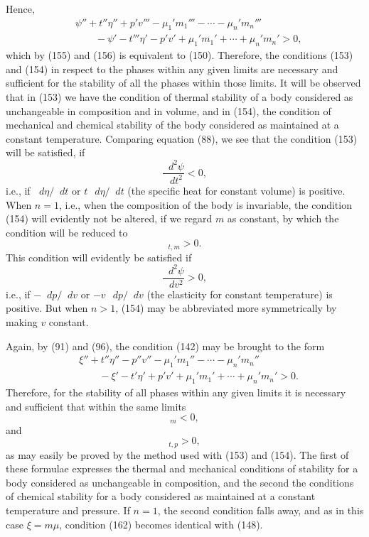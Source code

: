\documentclass[11pt]{article}
\newcommand{\dd}{\mathop{}\!d}
\newcommand{\D}{\Delta}
\begin{document}
Hence,
\begin{equation}
\begin{aligned}
&\psi''+t''\eta''+p'v'''-\mu_1'm_1'''-\cdots-\mu_n'm_n'''\\
&\qquad{}-\psi'-t'''\eta'-p'v'+\mu_1'm_1'+\cdots+\mu_n'm_n'>0,
\end{aligned}
\end{equation}
which by (155) and (156) is equivalent to (150). Therefore, the conditions (153) and (154) in respect to the phases within any given limits are necessary and sufficient for the stability of all the phases within those limits. It will be observed that in (153) we have the condition of thermal stability of a body considered as unchangeable in composition and in volume, and in (154), the condition of mechanical and chemical stability of the body considered as maintained at a constant temperature. Comparing equation (88), we see that the condition (153) will be satisfied, if
\[
\frac{\dd^2\psi}{\dd t^2}<0,
\]
i.e., if $\dd\eta/\dd t$ or $t\,\dd\eta/\dd t$ (the specific heat for constant volume) is positive. When $n=1$, i.e., when the composition of the body is invariable, the condition (154) will evidently not be altered, if we regard $m$ as constant, by which the condition will be reduced to
\begin{equation}
[\D\psi+p\D v]_{t,m}>0.
\end{equation}
This condition will evidently be satisfied if
\[
\frac{\dd^2\psi}{\dd v^2}>0,
\]
i.e., if $-\dd p/\dd v$ or $-v\,\dd p/\dd v$ (the elasticity for constant temperature) is positive. But when $n>1$, (154) may be abbreviated more symmetrically by making $v$ constant.

Again, by (91) and (96), the condition (142) may be brought to the form
\begin{equation}
\begin{aligned}
&\xi''+t''\eta''-p''v''-\mu_1'm_1''-\cdots-\mu_n'm_n''\\
&\qquad{}-\xi'-t'\eta'+p'v'+\mu_1'm_1'+\cdots+\mu_n'm_n'>0.
\end{aligned}
\end{equation}
Therefore, for the stability of all phases within any given limits it is necessary and sufficient that within the same limits
\begin{equation}
[\D\xi+\eta\D t-v\D p]_{m}<0,
\end{equation}
and
\begin{equation}
[\D\xi-\mu_1\D m_1-\cdots-\mu_n\D m_n]_{t,p}>0,
\end{equation}
as may easily be proved by the method used with (153) and (154). The first of these formulae expresses the thermal and mechanical conditions of stability for a body considered as unchangeable in composition, and the second the conditions of chemical stability for a body considered as maintained at a constant temperature and pressure. If $n=1$, the second condition falls away, and as in this case $\xi=m\mu$, condition (162) becomes identical with (148).
\end{document}
